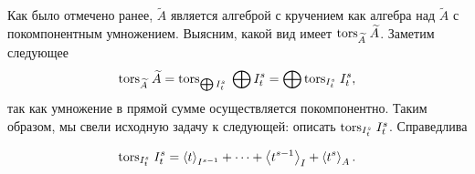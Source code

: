     Как было отмечено ранее, $\widetilde{A}$ является алгеброй с кручением как алгебра над $\widetilde{A}$
    с покомпонентным умножением. 
    Выясним, какой вид имеет $\textup{tors}_{\widetilde{A}}\;\widetilde{A}$. Заметим следующее
    \begin{equation*}
        \textup{tors}_{\widetilde{A}}\;\widetilde{A} = \textup{tors}_{\bigoplus I^s_t}\;\bigoplus I^s_t  = \bigoplus{\textup{tors}_{I^s_t}\;I^s_t},
    \end{equation*}
    так как умножение в прямой сумме осуществляется покомпонентно. Таким образом, мы свели исходную
    задачу к следующей: описать $\textup{tors}_{I^s_t}\;I^s_t$. Справедлива
    \begin{Theorem}
        \begin{equation*}
            \textup{tors}_{I^s_t}\;I^s_t = 
            \left< t \right>_{I^{s-1}} + 
            \dots +
            \left< t^{s-1} \right>_{I} + 
            \left< t^s \right>_A.
        \end{equation*}
    \end{Theorem}
